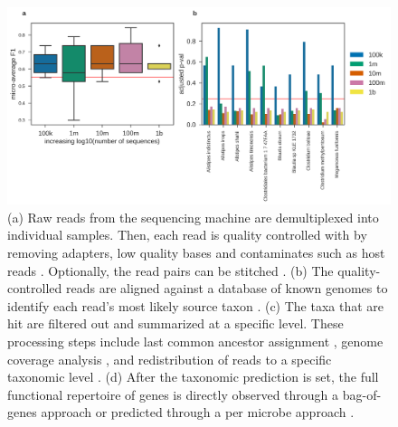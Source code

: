 \documentclass[conference,11pt]{IEEEtran}
\begin{document}
\begin{figure}[hbt]
    \centering
    \includegraphics[width=0.8\linewidth]{fig/karlsson2013_f1_combined.png}
    \caption{(a) Raw reads from the sequencing machine are demultiplexed into individual samples. Then, each read is quality controlled with by removing adapters, low quality bases and contaminates such as host reads \cite{consortium_structure_2012}. Optionally, the read pairs can be stitched \cite{magoc_flash:_2011}. (b) The quality-controlled reads are aligned against a database of known genomes to identify each read's most likely source taxon \cite{langmead_fast_2012}. (c) The taxa that are hit are filtered out and summarized at a specific level. These processing steps include last common ancestor assignment \cite{hong_pathoscope_2014}, genome coverage analysis \cite{wood_kraken:_2014}, and redistribution of reads to a specific taxonomic level \cite{lu_bracken:_2017}. (d) After the taxonomic prediction is set, the full functional repertoire of genes is directly observed through a bag-of-genes approach or predicted through a per microbe approach \cite{langille_predictive_2013}.}
      \label{fig:karlsson2013_f1_combined}
\end{figure}
\end{document}
